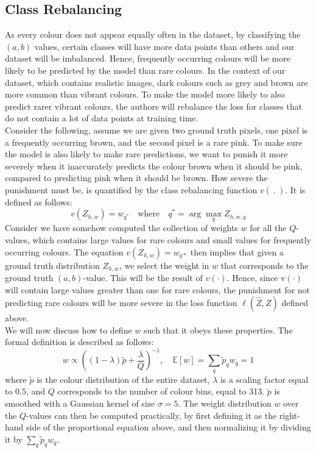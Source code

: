 \documentclass{article}
\begin{document}
\subsection{Class Rebalancing}
As every colour does not appear equally often in the dataset, by classifying the $\left(a,b\right)$ values, certain classes will have more data points than others and our dataset will be imbalanced. Hence, frequently occurring colours will be more likely to be predicted by the model than rare colours. In the context of our dataset, which contains realistic images, dark colours such as grey and brown are more common than vibrant colours. To make the model more likely to also predict rarer vibrant colours, the authors will rebalance the loss for classes that do not contain a lot of data points at training time.\\
Consider the following, assume we are given two ground truth pixels, one pixel is a frequently occurring brown, and the second pixel is a rare pink. To make sure the model is also likely to make rare predictions, we want to punish it more severely when it inaccurately predicts the colour brown when it should be pink, compared to predicting pink when it should be brown. How severe the punishment must be, is quantified by the class rebalancing function $v\left(\ .\ \right)$. It is defined as follows:
\[v(Z_{h, w}) = w_{q^*} \quad \text{where} \quad q^* = \arg\max_q Z_{h, w, q}\]
Consider we have somehow computed the collection of weights $w$ for all the $Q$-values, which contains large values for rare colours and small values for frequently occurring colours. The equation $v\left(Z_{h,w}\right)=w_{q\ast}$ then implies that given a ground truth distribution $Z_{h,w}$, we select the weight in $w$ that corresponds to the ground truth $(a, b)$-value. This will be the result of $v\left(\cdot\right)$. Hence, since v$\left(\cdot\right)$ will contain large values greater than one for rare colours, the punishment for not predicting rare colours will be more severe in the loss function $\ell\left(\hat{Z},Z\right)$ defined above.\\
We will now discuss how to define $w$ such that it obeys these properties. The formal definition is described as follows:
\[w\propto\left(\left(1-\lambda\right)\widetilde{p}+\frac{\lambda}{Q}\right)^{-1},\quad\mathbb{E}\left[w\right]=\sum_q{\widetilde{p}}_qw_q=1\]
where $\widetilde{p}$ is the colour distribution of the entire dataset, $\lambda$ is a scaling factor equal to $0.5$, and $Q$ corresponds to the number of colour bins, equal to 313. $\widetilde{p}$ is smoothed with a Gaussian kernel of size $\sigma=5$. The weight distribution $w$ over the $Q$-values can then be computed practically, by first defining it as the right-hand side of the proportional equation above, and then normalizing it by dividing it by $\sum_q{\widetilde{p}}_qw_q$.
\end{document}
